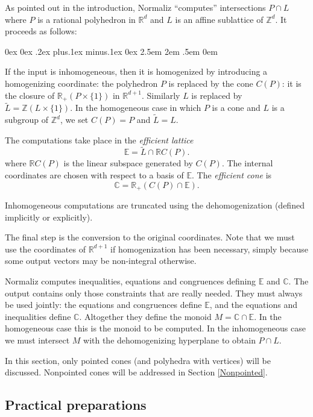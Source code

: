 \documentclass[12pt,a4paper]{scrartcl}
\newcounter{listi}
\newcommand{\stdli}{ \topsep0ex \partopsep0ex %
\parsep.2ex plus.1ex minus.1ex \itemsep0ex%
\leftmargin2.5em \labelwidth2em \labelsep.5em \rightmargin0em}%
\newenvironment{arab}{\begin{list}{\textup{(\arabic{listi})}}%
	{\usecounter{listi}\stdli}}{\end{list}}
\theoremstyle{definition}
\def\CC{{\mathbb C}}
\def\ZZ{{\mathbb Z}}
\def\RR{{\mathbb R}}
\def\EE{{\mathbb E}}
\begin{document}
As pointed out in the introduction, Normaliz ``computes'' intersections $P\cap L$ where $P$ is a rational polyhedron in $\RR^d$ and $L$ is an affine sublattice of $\ZZ^d$. It proceeds as follows:

\begin{arab}
	\item If the input is inhomogeneous, then it is homogenized by introducing a homogenizing coordinate: the polyhedron $P$ is replaced by the cone $C(P)$: it is the closure of $\RR_+(P\times \{1\})$ in $\RR^{d+1}$. Similarly $L$ is replaced by $\widetilde L=\ZZ(L\times \{1\})$. In the homogeneous case in which $P$ is a cone and $L$ is a subgroup of $\ZZ^d$, we set $C(P)=P$ and $\widetilde L=L$.
	
	\item The computations take place in the \emph{efficient lattice} 
	$$
	\EE=\widetilde{L}\cap \RR C(P).
	$$
	where $\RR C(P)$ is the linear subspace generated by $C(P)$. The internal coordinates are chosen with respect to a basis of $\EE$. The \emph{efficient cone} is
	$$
	\CC=\RR_+(C(P)\cap \EE).
	$$
	
	\item Inhomogeneous computations are truncated using the dehomogenization (defined implicitly or explicitly).
	
	\item The final step is the conversion to the original coordinates. Note that we must use the coordinates of $\RR^{d+1}$ if homogenization has been necessary, simply because some output vectors may be non-integral otherwise.
\end{arab}

Normaliz computes inequalities, equations and congruences defining $\EE$ and $\CC$. The output contains only those constraints that are really needed. They must always be used jointly: the equations and congruences define $\EE$, and the equations and inequalities define $\CC$. Altogether they define the monoid $M=\CC\cap\EE$. In the homogeneous case this is the monoid to be computed. In the inhomogeneous case we must intersect $M$ with the dehomogenizing hyperplane to obtain $P\cap L$.

In this section, only pointed cones (and polyhedra with vertices) will be discussed. Nonpointed cones will be addressed in Section \ref{Nonpointed}. 


\subsection{Practical preparations}
\end{document}
